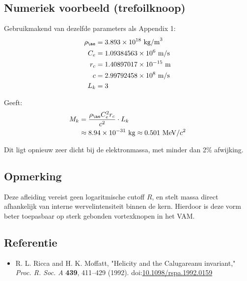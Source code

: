 \subsection*{Numeriek voorbeeld (trefoilknoop)}
Gebruikmakend van dezelfde parameters als Appendix 1:
\begin{align*}
    \rho_{\ae} &= 3.893 \times 10^{18}~\text{kg/m}^3 \\
    C_e &= 1.09384563 \times 10^6~\text{m/s} \\
    r_c &= 1.40897017 \times 10^{-15}~\text{m} \\
    c &= 2.99792458 \times 10^8~\text{m/s} \\
    L_k &= 3
\end{align*}

Geeft:
\begin{align*}
    M_k &= \frac{\rho_{\ae} C_e^2 r_c}{c^2} \cdot L_k \\
    &\approx 8.94 \times 10^{-31}~\text{kg} \approx 0.501~\text{MeV}/c^2
\end{align*}

Dit ligt opnieuw zeer dicht bij de elektronmassa, met minder dan 2\% afwijking.

\subsection*{Opmerking}
Deze afleiding vereist geen logaritmische cutoff \( R \), en stelt massa direct afhankelijk van interne wervelintensiteit binnen de kern. Hierdoor is deze vorm beter toepasbaar op sterk gebonden vortexknopen in het VAM.

\subsection*{Referentie}
\begin{itemize}
    \item R. L. Ricca and H. K. Moffatt, "Helicity and the Calugareanu invariant," \textit{Proc. R. Soc. A} \textbf{439}, 411--429 (1992). doi:\href{https://doi.org/10.1098/rspa.1992.0159}{10.1098/rspa.1992.0159}
\end{itemize}
